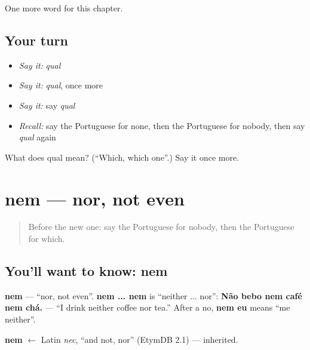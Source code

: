 \begin{grammarlens}[title={What you've built}]
One more word for this chapter.
\end{grammarlens}

\subsection*{Your turn}
\begin{itemize}
\raggedright
  \item \emph{Say it:} \emph{qual}
  \item \emph{Say it:} \emph{qual}, once more
  \item \emph{Say it:} say \emph{qual}
  \item \emph{Recall:} say the Portuguese for none, then the Portuguese for nobody, then say \emph{qual} again
\end{itemize}

\begin{tcolorbox}[breakable,colback=teal!4,colframe=teal!35!black,title={Before you move on}]
What does qual mean? (\textquotedblleft{}Which, which one\textquotedblright{}.) Say it once more.
\end{tcolorbox}
\section[nem]{nem — nor, not even}

\label{lesson:PT-C134-nem}



\begin{quote}
Before the new one: say the Portuguese for nobody, then the Portuguese for which.
\end{quote}

\subsection*{You'll want to know: nem}
\textbf{nem} — \textquotedblleft{}nor, not even\textquotedblright{}. \textbf{nem ... nem} is \textquotedblleft{}neither ... nor\textquotedblright{}: \textbf{Não bebo nem café nem chá.} — \textquotedblleft{}I drink neither coffee nor tea.\textquotedblright{} After a no, \textbf{nem eu} means \textquotedblleft{}me neither\textquotedblright{}.

\begin{cousinweb}
\textbf{nem} $\leftarrow$ Latin \emph{nec}, \textquotedblleft{}and not, nor\textquotedblright{} (EtymDB 2.1) — inherited.
\end{cousinweb}

